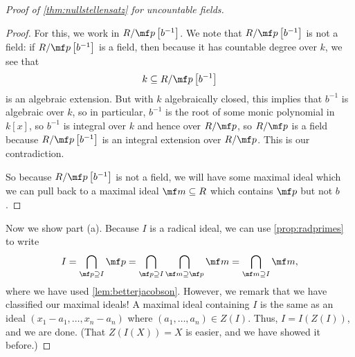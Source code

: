 \begin{proof}[Proof of \autoref{thm:nullstellensatz} for uncountable fields]
\begin{proof}
		For this, we work in $R/\mf p\left[b^{-1}\right]$. We note that $R/\mf p\left[b^{-1}\right]$ is not a field: if $R/\mf p\left[b^{-1}\right]$ is a field, then because it has countable degree over $k$, we see that
		\[k\subseteq R/\mf p\left[b^{-1}\right]\]
		is an algebraic extension. But with $k$ algebraically closed, this implies that $b^{-1}$ is algebraic over $k$, so in particular, $b^{-1}$ is the root of some monic polynomial in $k[x]$, so $b^{-1}$ is integral over $k$ and hence over $R/\mf p$, so $R/\mf p$ is a field because $R/\mf p\left[b^{-1}\right]$ is an integral extension over $R/\mf p$. This is our contradiction.

		So because $R/\mf p\left[b^{-1}\right]$ is not a field, we will have some maximal ideal which we can pull back to a maximal ideal $\mf m\subseteq R$ which contains $\mf p$ but not $b$.
	\end{proof}
	Now we show part (a). Because $I$ is a radical ideal, we can use \autoref{prop:radprimes} to write
	\[I=\bigcap_{\mf p\supseteq I}\mf p=\bigcap_{\mf p\supseteq I}\bigcap_{\mf m\supseteq\mf p}\mf m=\bigcap_{\mf m\supseteq I}\mf m,\]
	where we have used \autoref{lem:betterjacobson}. However, we remark that we have classified our maximal ideals! A maximal ideal containing $I$ is the same as an ideal $(x_1-a_1,\ldots,x_n-a_n)$ where $(a_1,\ldots,a_n)\in Z(I)$. Thus, $I=I(Z(I))$, and we are done. (That $Z(I(X))=X$ is easier, and we have showed it before.) %
\end{proof}

